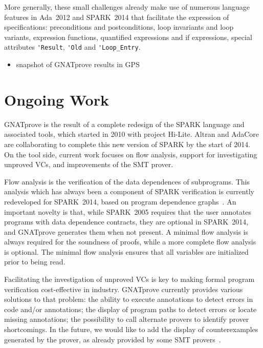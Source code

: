 \documentclass[sttt,draft]{svjour}
\newcommand{\hilite}{Hi-Lite}
\newcommand{\gnatprove}{GNATprove\xspace}
\newcommand{\oldspark}{SPARK~2005\xspace}
\newcommand{\newspark}{SPARK~2014\xspace}
\newcommand{\adatwtw}{Ada~2012\xspace}
\begin{document}
More generally, these small challenges already make use of numerous language
features in \adatwtw and \newspark that facilitate the expression of
specifications: preconditions and postconditions, loop invariants and loop
variants, expression functions, quantified expressions and if expressions,
special attributes \verb|'Result|, \verb|'Old| and \verb|'Loop_Entry|.

\begin{itemize}
\item snapshot of GNATprove results in GPS
\end{itemize}

\section{Ongoing Work}
\label{ongoing}

\gnatprove is the result of a complete redesign of the SPARK language and
associated tools, which started in 2010 with project \hilite.\cite{Hi-Lite}
Altran and AdaCore are collaborating to complete this new version of SPARK by
the start of 2014. On the tool side, current work focuses on flow analysis,
support for investigating unproved VCs, and improvements of the SMT prover.

Flow analysis is the verification of the data dependences of subprograms. This
analysis which has always been a component of SPARK verification is currently
redeveloped for \newspark, based on program dependence
graphs~\cite{horwitz:1988:pldi}. An important novelty is that, while \oldspark
requires that the user annotates programs with data dependence contracts, they
are optional in \newspark, and \gnatprove generates them when not present. A
minimal flow analysis is always required for the soundness of proofs, while a
more complete flow analysis is optional. The minimal flow analysis ensures that
all variables are initialized prior to being read.

Facilitating the investigation of unproved VCs is key to making formal program
verification cost-effective in industry. \gnatprove currently provides various
solutions to that problem: the ability to execute annotations to detect errors
in code and/or annotations; the display of program paths to detect errors or
locate missing annotations; the possibility to call alternate provers to
identify prover shortcomings. In the future, we would like to add the display
of counterexamples generated by the prover, as already provided by some SMT
provers~\cite{CVC3,Z3model}.
\end{document}
